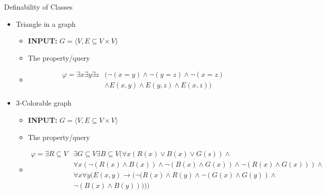 \documentclass[usenames,dvipsnames]{beamer}
\newcommand\ldiaarg[1]{\langle#1\rangle}
\begin{document}
\begin{frame}{Definability of Classes}
    \begin{itemize}
        \item Triangle in a graph
        \begin{itemize}
            \item \textbf{INPUT:} $G = \ldiaarg{V, E\subseteq V\times V}$
            \item The property/query
            \item[]
            \begin{align*}
            \varphi =  \exists x\exists y\exists z &(\neg(x=y)\wedge\neg(y=z)\wedge\neg(x=z)\\
                                                    &\wedge E(x,y)\wedge E(y,z)\wedge E(x,z))
            \end{align*}
        \end{itemize}

        \item 3-Colorable graph
        \begin{itemize}
            \item \textbf{INPUT:} $G = \ldiaarg{V, E\subseteq V\times V}$
            \item The property/query
            \item[]
            \begin{align*}
            \varphi =  \exists R\subseteq V&\exists G\subseteq V\exists B\subseteq V (\forall x (R(x)\vee B(x)\vee G(s))\wedge\\
                                            &\forall x (\neg (R(x)\wedge B(x))\wedge\neg(B(x)\wedge G(x))\wedge\neg(R(x)\wedge G(x)))\wedge\\
                                            &\forall x\forall y(E(x,y)\rightarrow(\neg(R(x)\wedge R(y)\wedge\neg(G(x)\wedge G(y))\wedge\\
                                                                                    &\neg(B(x)\wedge B(y)))))
            \end{align*}
        \end{itemize}
    \end{itemize}
\end{frame}
\end{document}
